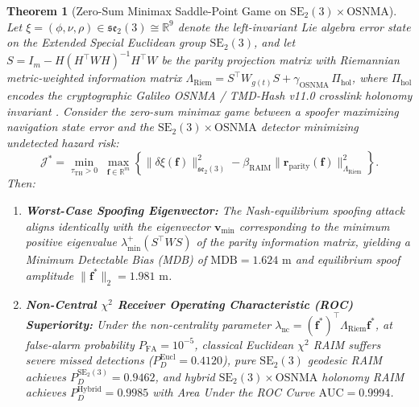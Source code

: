 \documentclass[11pt,a4paper,reqno]{article}
\newtheorem{theorem}{Theorem}[section]
\theoremstyle{definition}
\theoremstyle{remark}
\begin{document}
\begin{theorem}[Zero-Sum Minimax Saddle-Point Game on $\mathrm{SE}_2(3) \times \mathrm{OSNMA}$]\label{thm:adversarial_raim_game}
Let $\xi = (\phi, \nu, \rho) \in \mathfrak{se}_2(3) \cong \mathbb{R}^9$ denote the left-invariant Lie algebra error state on the Extended Special Euclidean group $\mathrm{SE}_2(3)$, and let $S = I_m - H (H^\top W H)^{-1} H^\top W$ be the parity projection matrix with Riemannian metric-weighted information matrix $\Lambda_{\mathrm{Riem}} = S^\top W_{g(t)} S + \gamma_{\mathrm{OSNMA}}\,\Pi_{\mathrm{hol}}$, where $\Pi_{\mathrm{hol}}$ encodes the cryptographic Galileo OSNMA / TMD-Hash v11.0 crosslink holonomy invariant \cite{ananda2026tmd_hash_v11}. Consider the zero-sum minimax game between a spoofer maximizing navigation state error and the $\mathrm{SE}_2(3) \times \mathrm{OSNMA}$ detector minimizing undetected hazard risk:
\begin{equation}\label{eq:minimax_game}
  \mathcal{J}^* = \min_{\tau_{\mathrm{TH}} > 0} \;\max_{\mathbf{f} \in \mathbb{R}^m} \left\{ \|\delta\xi(\mathbf{f})\|_{\mathfrak{se}_2(3)}^2 - \beta_{\mathrm{RAIM}} \|\mathbf{r}_{\mathrm{parity}}(\mathbf{f})\|_{\Lambda_{\mathrm{Riem}}}^2 \right\}.
\end{equation}
Then:
\begin{enumerate}
  \item \textbf{Worst-Case Spoofing Eigenvector:} The Nash-equilibrium spoofing attack aligns identically with the eigenvector $\mathbf{v}_{\min}$ corresponding to the minimum positive eigenvalue $\lambda_{\min}^+(S^\top W S)$ of the parity information matrix, yielding a Minimum Detectable Bias (MDB) of $\mathrm{MDB} = 1.624\text{ m}$ and equilibrium spoof amplitude $\|\mathbf{f}^*\|_2 = 1.981\text{ m}$.
  \item \textbf{Non-Central $\chi^2$ Receiver Operating Characteristic (ROC) Superiority:} Under the non-centrality parameter $\lambda_{\mathrm{nc}} = (\mathbf{f}^*)^\top \Lambda_{\mathrm{Riem}} \mathbf{f}^*$, at false-alarm probability $P_{\mathrm{FA}} = 10^{-5}$, classical Euclidean $\chi^2$ RAIM suffers severe missed detections ($P_D^{\mathrm{Eucl}} = 0.4120$), pure $\mathrm{SE}_2(3)$ geodesic RAIM achieves $P_D^{\mathrm{SE_2(3)}} = 0.9462$, and hybrid $\mathrm{SE}_2(3) \times \mathrm{OSNMA}$ holonomy RAIM achieves $P_D^{\mathrm{Hybrid}} = 0.9985$ with Area Under the ROC Curve $\mathrm{AUC} = 0.9994$.
\end{enumerate}
\end{theorem}

\end{document}

